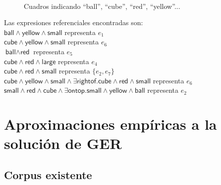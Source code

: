 \begin{figure}[ht]
\begin{center}
\\[0pt]
\caption{Cuadros indicando ``ball'', ``cube'', ``red'', ``yellow''...}
\label{fig-modelo17}
\end{center}
\end{figure}

Las expresiones referenciales encontradas son:\\

$\textsf{ball} \wedge \textsf{yellow} \wedge \textsf{small}$ representa $e_1$ \\
$\textsf{cube} \wedge \textsf{yellow} \wedge \textsf{small}$ representa $e_6$ \\
$\textsf{ball} \wedge \textsf{red}$ representa $e_5$ \\
$\textsf{cube} \wedge \textsf{red} \wedge \textsf{large}$ representa $e_4$ \\
$\textsf{cube} \wedge \textsf{red} \wedge \textsf{small}$ representa $\{e_2,e_7\}$  \\
$\textsf{cube} \wedge \textsf{yellow} \wedge \textsf{small} \wedge \exists \textsf{rightof}. \textsf{cube} \wedge \textsf{red} \wedge \textsf{small}$ representa $e_6$ \\
$\textsf{small} \wedge \textsf{red} \wedge \textsf{cube} \wedge \exists \textsf{ontop}. \textsf{small} \wedge \textsf{yellow} \wedge \textsf{ball}$ representa $e_2$ \\




\section{Aproximaciones emp\'iricas a la soluci\'on de GER}

\subsection{Corpus existente}
\label{sec:corpus2}
\label{sec:corpusTUNA}

